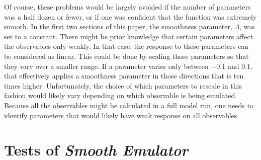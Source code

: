 \documentclass[UserManual.tex]{subfiles}
\begin{document}
Of course, these problems would be largely avoided if the number of parameters was a half dozen or fewer, or if one was confident that the function was extremely smooth. In the first two sections of this paper, the smoothness parameter, $\Lambda$, was set to a constant. There might be prior knowledge that certain parameters affect the observables only weakly. In that case, the response to these parameters can be considered as linear. This could be done by scaling those parameters so that they vary over a smaller range. If a parameter varies only between $-0.1$ and $0.1$, that effectively applies a smoothness parameter in those directions that is ten times higher. Unfortunately, the choice of which parameters to rescale in this fashion would likely vary depending on which observable is being emulated. Because all the observables might be calculated in a full model run, one needs to identify parameters that would likely have weak response on all observables. 

\section{Tests of {\it Smooth Emulator}}
\end{document}
